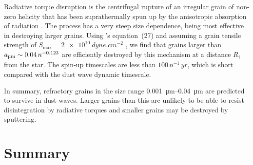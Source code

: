 Radiative torque disruption \citep{Hoang:2018a} is the centrifugal
rupture of an irregular grain of non-zero helicity that has been
suprathermally spun up by the anisotropic absorption of radiation
\citep{Dolginov:1976a, Draine:1996b, Lazarian:2007a}.  The process has
a very steep size dependence, being most effective in destroying
larger grains.  Using \citeauthor{Hoang:2018a}'s equation~(27) and
assuming a grain tensile strength of
\(S_{\text{max}} = \SI{2e10}{dyne.cm^{-2}}\) \citetext{\S~2.4 of
  \citealp{Borkowski:1995a}}, we find that grains larger than
\(\amu \sim 0.04\, n^{-0.123}\) are efficiently destroyed by this
mechanism at a distance \(R_\dag\) from the star. The spin-up timescales
are less than \(100\, n^{-1}\,\si{yr}\), which is short compared with
the dust wave dynamic timescale.

In summary, refractory grains in the size range
\SIrange{0.001}{0.04}{\um} are predicted to survive in dust waves.
Larger grains than this are unlikely to be able to resist
disintegration by radiative torques and smaller grains may be
destroyed by sputtering.







\section{Summary}
\label{sec:summary}

